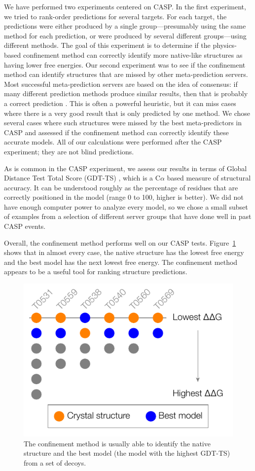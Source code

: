 \documentclass[12pt]{article}
\begin{document}
We have performed two experiments centered on CASP. In the first experiment, we tried to rank-order predictions for
several targets. For each target, the predictions were either produced by a single group---presumably using the same
method for each prediction, or were produced by several different groups---using different methods. The goal of this
experiment is to determine if the physics-based confinement method can correctly identify more native-like structures as
having lower free energies. Our second experiment was to see if the confinement method can identify structures that are
missed by other meta-prediction servers. Most successful meta-prediction servers are based on the idea of consensus: if
many different prediction methods produce similar results, then that is probably a correct prediction
\cite{Kryshtafovych2011,Wang2011}. This is often a powerful heuristic, but it can miss cases where there is a very good
result that is only predicted by one method. We chose several cases where such structures were missed by the best
meta-predictors in CASP and assessed if the confinement method can correctly identify these accurate models. All of our
calculations were performed after the CASP experiment; they are not blind predictions.

As is common in the CASP experiment, we assess our results in terms of Global Distance Test Total Score (GDT-TS)
\cite{Zemla2003}, which is a C$\alpha$ based measure of structural accuracy. It can be understood roughly as the
percentage of residues that are correctly positioned in the model (range 0 to 100, higher is better). We did not have
enough computer power to analyze every model, so we chose a small subset of examples from a selection of different
server groups that have done well in past CASP events.

Overall, the confinement method performs well on our CASP tests. Figure~\ref{fig:summary_casp} shows that in almost
every case, the native structure has the lowest free energy and the best model has the next lowest free energy. The
confinement method appears to be a useful tool for ranking structure predictions.

\begin{figure}
\begin{center}
\includegraphics[width=3.5 in]{casp.pdf}
\end{center}
\caption{The confinement method is usually able to identify the native structure and the best model (the model with the
    highest GDT-TS) from a set of decoys.}
\label{fig:summary_casp}
\end{figure}
\end{document}
